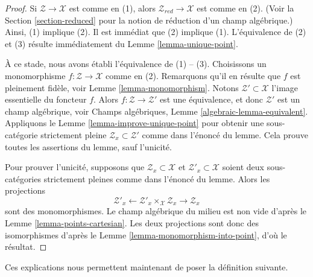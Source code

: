 \begin{proof}
Si $\mathcal{Z} \to \mathcal{X}$ est comme en (1), alors
$\mathcal{Z}_{red} \to \mathcal{X}$ est comme en (2). (Voir la
Section \ref{section-reduced}
pour la notion de réduction d'un champ algébrique.)
Ainsi, (1) implique (2).
Il est immédiat que (2) implique (1).
L'équivalence de (2) et (3) résulte immédiatement du
Lemme \ref{lemma-unique-point}.

\medskip\noindent
À ce stade, nous avons établi l'équivalence de (1) -- (3).
Choisissons un monomorphisme $f : \mathcal{Z} \to \mathcal{X}$ comme en (2).
Remarquons qu'il en résulte que $f$ est pleinement fidèle, voir
Lemme \ref{lemma-monomorphism}.
Notons $\mathcal{Z}' \subset \mathcal{X}$ l'image essentielle du foncteur
$f$. Alors $f : \mathcal{Z} \to \mathcal{Z}'$ est une équivalence, et donc
$\mathcal{Z}'$ est un champ algébrique, voir
Champs algébriques, Lemme \ref{algebraic-lemma-equivalent}.
Appliquons le
Lemme \ref{lemma-improve-unique-point}
pour obtenir une sous-catégorie strictement pleine $\mathcal{Z}_x \subset \mathcal{Z}'$
comme dans l'énoncé du lemme.
Cela prouve toutes les assertions du lemme, sauf l'unicité.

\medskip\noindent
Pour prouver l'unicité, supposons que
$\mathcal{Z}_x \subset \mathcal{X}$
et
$\mathcal{Z}'_x \subset \mathcal{X}$
soient deux sous-catégories strictement pleines comme dans l'énoncé du lemme.
Alors les projections
$$
\mathcal{Z}'_x
\longleftarrow
\mathcal{Z}'_x \times_\mathcal{X} \mathcal{Z}_x
\longrightarrow
\mathcal{Z}_x
$$
sont des monomorphismes. Le champ algébrique du milieu est non vide d'après le
Lemme \ref{lemma-points-cartesian}.
Les deux projections sont donc des isomorphismes d'après le
Lemme \ref{lemma-monomorphism-into-point},
d'où le résultat.
\end{proof}

\noindent
Ces explications nous permettent maintenant de poser la définition suivante.

